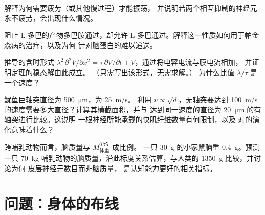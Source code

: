 \begin{exercise}[$\star\star$]\label{exo:b3:nervous-systems:8}
解释为何需要疲劳（或其他慢过程）才能振荡，
并说明若两个相互抑制的神经元
永不疲劳，会出现什么情况。
\end{exercise}

\begin{exercise}[$\star\star$]\label{exo:b3:nervous-systems:9}
阻止 L-多巴的产物多巴胺通过，却允许
L-多巴通过。解释这一性质如何用于帕金森病的治疗，以及为何
针对脑蛋白的难以递送。
\end{exercise}

\begin{exercise}[$\star\star\star$]\label{exo:b3:nervous-systems:10}
推导的含时形式 $\lambda^{2}\,\partial^{2}
V/\partial x^{2} = \tau\,\partial V/\partial t + V$，通过将电容电流与膜电流相加，
并证明定理的稳态解由此成立。
（只需写出该形式，无需求解。）
为什么比值 $\lambda/\tau$ 是一个速度？
\end{exercise}

\begin{exercise}[$\star\star\star$]\label{exo:b3:nervous-systems:11}
鱿鱼巨轴突直径为 \qty{500}{\micro m}，为 \qty{25}{m/s}。
利用 $v \propto \sqrt{d}$，无轴突要达到
\qty{100}{m/s} 的速度需要多大直径？计算其横截面积，并与
达到同一速度的直径为 \qty{20}{\micro m} 的有轴突进行比较。这说明
一根神经所能承载的快肌纤维数量有何限制，以及
对的演化意味着什么？
\end{exercise}

\begin{exercise}[$\star\star\star$]\label{exo:b3:nervous-systems:12}
跨哺乳动物而言，脑质量与 $M_{\text{体重}}^{0.75}$ 成比例。
一只 \qty{30}{g} 的小家鼠脑重 \qty{0.4}{g}。预测一只
\qty{70}{kg} 哺乳动物的脑质量，沿此标度关系估算，与人类的 \qty{1350}{g} 比较，并讨论为何
皮层神经元数目而非脑质量，
是认知能力更好的相关指标。
\end{exercise}

\section{问题：身体的布线}


